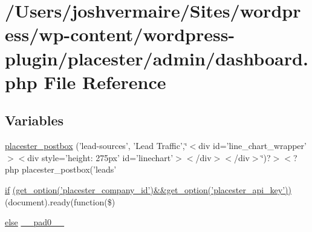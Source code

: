 \hypertarget{dashboard_8php}{
\section{/Users/joshvermaire/Sites/wordpress/wp-\/content/wordpress-\/plugin/placester/admin/dashboard.php File Reference}
\label{df/d86/dashboard_8php}
}
\subsection*{Variables}
\begin{DoxyCompactItemize}
\item 
\hyperlink{dashboard_8php_acc6df334008c440b57f23babb4031369}{placester\_\-postbox} ('lead-\/sources', 'Lead Traffic',\char`\"{}$<$div id='line\_\-chart\_\-wrapper'$>$$<$div style='height: 275px' id='linechart'$>$$<$/div$>$$<$/div$>$\char`\"{})?$>$$<$?php placester\_\-postbox('leads'
\item 
\hyperlink{listings__list__lone__divbased_8php_a0b49fff73af3a13232913ea65ca484d9}{if} \hyperlink{dashboard_8php_a73239abf40e2cb0fe837da6001b81be2}{(get\_\-option('placester\_\-company\_\-id')\&\&get\_\-option('placester\_\-api\_\-key'))} (document).ready(function(\$)
\item 
\hyperlink{listings__list__of__map_8php_a0544c3fe466e421738dae463968b70ba}{else} \hyperlink{dashboard_8php_a8e01dcc96c43199448ee66f7c2ae8ea6}{\_\-\_\-pad0\_\-\_\-}
\end{DoxyCompactItemize}


